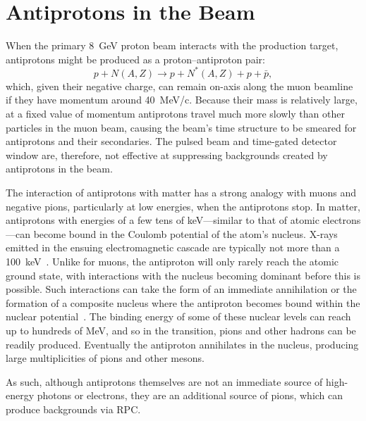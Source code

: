 \section{Antiprotons in the Beam}
When the primary 8~GeV proton beam interacts with the production target, antiprotons might be produced as a proton--antiproton pair:
\begin{equation}
p + N(A,Z) \rightarrow p + N^*(A,Z) + p+\bar{p},
\end{equation}
which, given their negative charge, can remain on-axis along the muon beamline if they have momentum around 40~MeV/c.
Because their mass is relatively large, at a fixed value of momentum antiprotons travel much more slowly than other particles in the muon beam, causing the beam's time structure to be smeared for antiprotons and their secondaries.
The pulsed beam and time-gated detector window are, therefore, not effective at suppressing backgrounds created by antiprotons in the beam.

%
The interaction of antiprotons with matter has a strong analogy with muons and negative pions, particularly at low energies, when the antiprotons stop.
In matter, antiprotons with energies of a few tens of keV---similar to that of atomic electrons---can become bound in the Coulomb potential of the atom's nucleus.
X-rays emitted in the ensuing electromagnetic cascade are typically not more than a 100~keV~\cite{Aramaki201352}.
Unlike for muons, the antiproton will only rarely reach the atomic ground state, with interactions with the nucleus becoming dominant before this is possible.
Such interactions can take the form of an immediate annihilation or the formation of a composite nucleus where the antiproton becomes bound within the nuclear potential~\cite{Wong:1984fy,Mishustin:2004xa}.
The binding energy of some of these nuclear levels can reach up to hundreds of MeV, and so in the transition, pions and other hadrons can be readily produced.
Eventually the antiproton annihilates in the nucleus, producing large multiplicities of pions and other mesons.

As such, although antiprotons themselves are not an immediate source of high-energy photons or electrons, they are an additional source of pions, which can produce backgrounds via \acf{RPC}.


